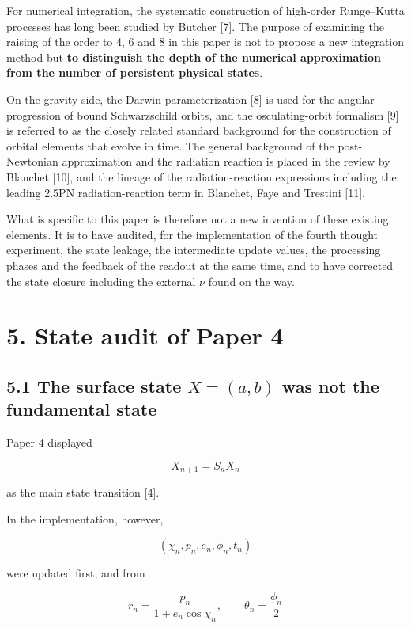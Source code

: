 \documentclass[
  a4paper,
]{article}
\begin{document}
For numerical integration, the systematic construction of high-order
Runge--Kutta processes has long been studied by Butcher {[}7{]}. The
purpose of examining the raising of the order to 4, 6 and 8 in this
paper is not to propose a new integration method but \textbf{to
distinguish the depth of the numerical approximation from the number of
persistent physical states}.

On the gravity side, the Darwin parameterization {[}8{]} is used for the
angular progression of bound Schwarzschild orbits, and the
osculating-orbit formalism {[}9{]} is referred to as the closely related
standard background for the construction of orbital elements that evolve
in time. The general background of the post-Newtonian approximation and
the radiation reaction is placed in the review by Blanchet {[}10{]}, and
the lineage of the radiation-reaction expressions including the leading
2.5PN radiation-reaction term in Blanchet, Faye and Trestini {[}11{]}.

What is specific to this paper is therefore not a new invention of these
existing elements. It is to have audited, for the implementation of the
fourth thought experiment, the state leakage, the intermediate update
values, the processing phases and the feedback of the readout at the
same time, and to have corrected the state closure including the
external \(\nu\) found on the way.

\section{5. State audit of Paper 4}\label{state-audit-of-paper-4}

\subsection{\texorpdfstring{5.1 The surface state \(X=(a,b)\) was not
the fundamental
state}{5.1 The surface state X=(a,b) was not the fundamental state}}\label{the-surface-state-xab-was-not-the-fundamental-state}

Paper 4 displayed

\[
X_{n+1}=S_nX_n
\]

as the main state transition {[}4{]}.

In the implementation, however,

\[
(\chi_n,p_n,e_n,\phi_n,t_n)
\]

were updated first, and from

\[
r_n=\frac{p_n}{1+e_n\cos\chi_n},
\qquad
\theta_n=\frac{\phi_n}{2}
\]
\end{document}
